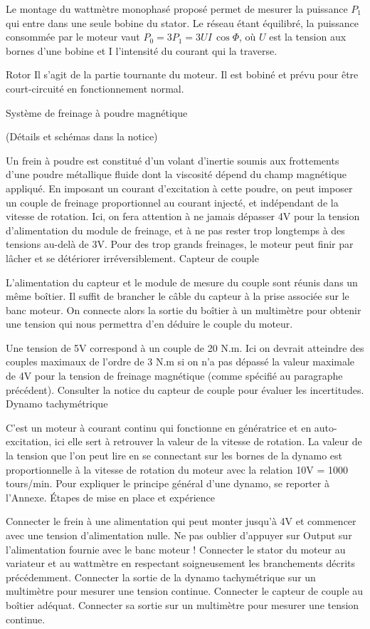 \documentclass{article}%
\begin{document}
Le montage du wattmètre monophasé proposé permet de mesurer la puissance $P_1$ qui entre dans une seule bobine du stator. Le réseau étant équilibré, la puissance consommée par le moteur vaut $P_0 = 3P_1 = 3UI\,\cos\Phi$, où $U$ est la tension aux bornes d'une bobine et I l'intensité du courant qui la traverse.

Rotor
    Il s'agit de la partie tournante du moteur. Il est bobiné et prévu pour être court-circuité en fonctionnement normal.

Système de freinage à poudre magnétique

(Détails et schémas dans la notice)

Un frein à poudre est constitué d'un volant d'inertie soumis aux frottements d'une poudre métallique fluide dont la viscosité dépend du champ magnétique appliqué. En imposant un courant d'excitation à cette poudre, on peut imposer un couple de freinage proportionnel au courant injecté, et indépendant de la vitesse de rotation. Ici, on fera attention à ne jamais dépasser 4V pour la tension d'alimentation du module de freinage, et à ne pas rester trop longtemps à des tensions au-delà de 3V. Pour des trop grands freinages, le moteur peut finir par lâcher et se détériorer irréversiblement.
Capteur de couple

L'alimentation du capteur et le module de mesure du couple sont réunis dans un même boîtier. Il suffit de brancher le câble du capteur à la prise associée sur le banc moteur. On connecte alors la sortie du boîtier à un multimètre pour obtenir une tension qui nous permettra d'en déduire le couple du moteur.

Une tension de 5V correspond à un couple de 20 N.m. Ici on devrait atteindre des couples maximaux de l'ordre de 3 N.m si on n'a pas dépassé la valeur maximale de 4V pour la tension de freinage magnétique (comme spécifié au paragraphe précédent). Consulter la notice du capteur de couple pour évaluer les incertitudes.
Dynamo tachymétrique

C'est un moteur à courant continu qui fonctionne en génératrice et en auto-excitation, ici elle sert à retrouver la valeur de la vitesse de rotation. La valeur de la tension que l'on peut lire en se connectant sur les bornes de la dynamo est proportionnelle à la vitesse de rotation du moteur avec la relation 10V = 1000 tours/min. Pour expliquer le principe général d'une dynamo, se reporter à l'Annexe.
Étapes de mise en place et expérience

    Connecter le frein à une alimentation qui peut monter jusqu'à 4V et commencer avec une tension d'alimentation nulle. Ne pas oublier d'appuyer sur Output sur l'alimentation fournie avec le banc moteur !
    Connecter le stator du moteur au variateur et au wattmètre en respectant soigneusement les branchements décrits précédemment.
    Connecter la sortie de la dynamo tachymétrique sur un multimètre pour mesurer une tension continue.
    Connecter le capteur de couple au boîtier adéquat. Connecter sa sortie sur un multimètre pour mesurer une tension continue.
\end{document}
